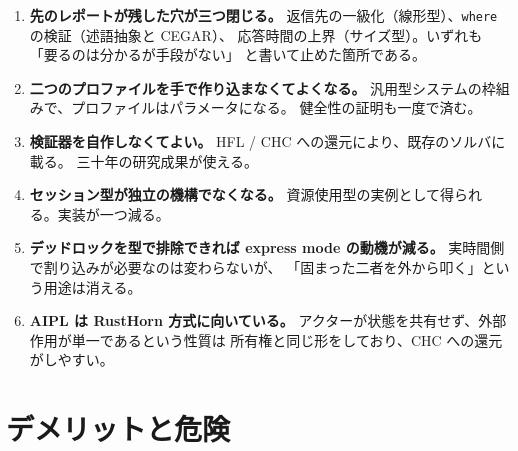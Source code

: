 \documentclass[11pt,a4paper]{ltjsarticle}
\theoremstyle{remark}
\begin{document}
\begin{enumerate}
\item \textbf{先のレポートが残した穴が三つ閉じる。}
  返信先の一級化（線形型）、\texttt{where} の検証（述語抽象と CEGAR）、
  応答時間の上界（サイズ型）。いずれも「要るのは分かるが手段がない」
  と書いて止めた箇所である。

\item \textbf{二つのプロファイルを手で作り込まなくてよくなる。}
  汎用型システムの枠組みで、プロファイルはパラメータになる。
  健全性の証明も一度で済む。

\item \textbf{検証器を自作しなくてよい。}
  HFL / CHC への還元により、既存のソルバに載る。
  三十年の研究成果が使える。

\item \textbf{セッション型が独立の機構でなくなる。}
  資源使用型の実例として得られる。実装が一つ減る。

\item \textbf{デッドロックを型で排除できれば express mode の動機が減る。}
  実時間側で割り込みが必要なのは変わらないが、
  「固まった二者を外から叩く」という用途は消える。

\item \textbf{AIPL は RustHorn 方式に向いている。}
  アクターが状態を共有せず、外部作用が単一であるという性質は
  所有権と同じ形をしており、CHC への還元がしやすい。
\end{enumerate}

\section{デメリットと危険}
\end{document}
